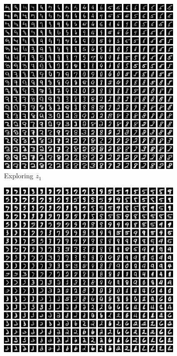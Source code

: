 \begin{figure}[t]
    \centering
    \begin{subfigure}{0.3\textwidth}
        \centering
        \includegraphics[width=\textwidth]{images/vlae_plots1.png}
        \caption{Exploring $z_1$}
        \label{subfig:vlae_plots1}
    \end{subfigure}
    \hfill
    \begin{subfigure}{0.3\textwidth}
        \centering
        \includegraphics[width=\textwidth]{images/vlae_plots2.png}

\end{subfigure}
\end{figure}
